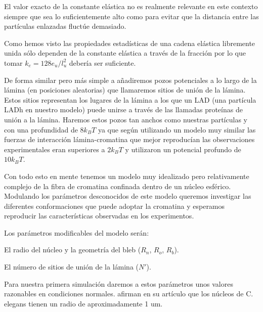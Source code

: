 El valor exacto de la constante elástica no es realmente relevante en este contexto siempre que sea lo suficientemente alto como para evitar que la distancia entre las partículas enlazadas fluctúe demasiado.

Como hemos visto las propiedades estadísticas de una cadena elástica libremente unida sólo dependen de la constante elástica a través de la fracción por lo que tomar $k_e=128e_u/l_u^2$ debería ser suficiente.

De forma similar pero más simple a \cite{Bajpai2021} añadiremos pozos potenciales a lo largo de la lámina (en posiciones aleatorias) que llamaremos sitios de unión de la lámina. Estos sitios representan los lugares de la lámina a los que un LAD (una partícula LADh en nuestro modelo) puede unirse a través de las llamadas proteínas de unión a la lámina. Haremos estos pozos tan anchos como nuestras partículas y con una profundidad de $8k_BT$ ya que según \cite{Maji2020} utilizando un modelo muy similar las fuerzas de interacción lámina-cromatina que mejor reproducían las observaciones experimentales eran superiores a $2k_BT$ y \cite{Bajpai2021} utilizaron un potencial profundo de $10k_BT$.

Con todo esto en mente tenemos un modelo muy idealizado pero relativamente complejo de la fibra de cromatina confinada dentro de un núcleo esférico. Modulando los parámetros desconocidos de este modelo queremos investigar las diferentes conformaciones que puede adoptar la cromatina y esperamos reproducir las características observadas en los experimentos.

Los parámetros modificables del modelo serán:

El radio del núcleo y la geometría del bleb ($R_n$, $R_o$, $R_b$).

El número de sitios de unión de la lámina ($N'$).

Para nuestra primera simulación daremos a estos parámetros unos valores razonables en condiciones normales. \cite{Ikegami2010} afirman en su artículo que los núcleos de C. elegans tienen un radio de aproximadamente 1 $\text{um}$.
